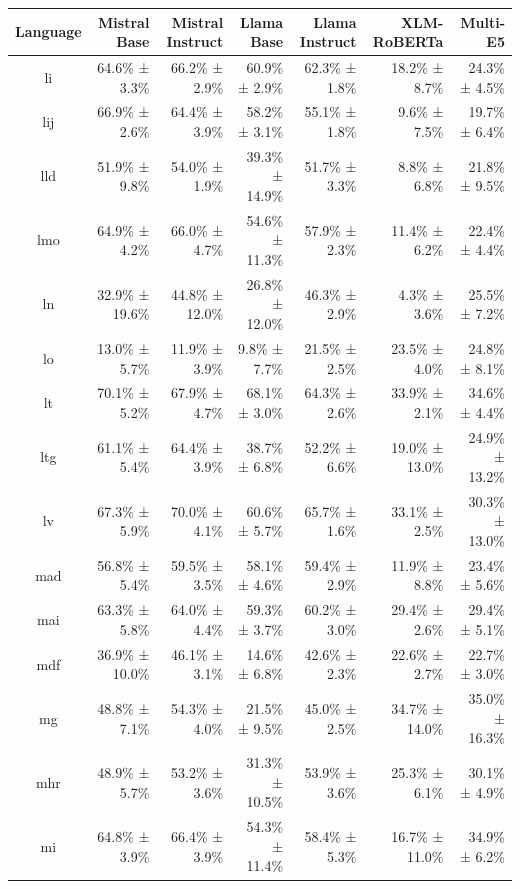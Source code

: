\documentclass[10pt, a4paper]{article}
\begin{document}
\begin{table}[h]
\centering
\scriptsize
\begin{tabular}{crrrrrr}
\hline
\textbf{Language} & \textbf{Mistral Base} & \textbf{Mistral Instruct} & \textbf{Llama Base} & \textbf{Llama Instruct} & \textbf{XLM-RoBERTa} & \textbf{Multi-E5} \\
\hline
li & 64.6\% ± 3.3\% & 66.2\% ± 2.9\% & 60.9\% ± 2.9\% & 62.3\% ± 1.8\% & 18.2\% ± 8.7\% & 24.3\% ± 4.5\% \\
lij & 66.9\% ± 2.6\% & 64.4\% ± 3.9\% & 58.2\% ± 3.1\% & 55.1\% ± 1.8\% & 9.6\% ± 7.5\% & 19.7\% ± 6.4\% \\
lld & 51.9\% ± 9.8\% & 54.0\% ± 1.9\% & 39.3\% ± 14.9\% & 51.7\% ± 3.3\% & 8.8\% ± 6.8\% & 21.8\% ± 9.5\% \\
lmo & 64.9\% ± 4.2\% & 66.0\% ± 4.7\% & 54.6\% ± 11.3\% & 57.9\% ± 2.3\% & 11.4\% ± 6.2\% & 22.4\% ± 4.4\% \\
ln & 32.9\% ± 19.6\% & 44.8\% ± 12.0\% & 26.8\% ± 12.0\% & 46.3\% ± 2.9\% & 4.3\% ± 3.6\% & 25.5\% ± 7.2\% \\
lo & 13.0\% ± 5.7\% & 11.9\% ± 3.9\% & 9.8\% ± 7.7\% & 21.5\% ± 2.5\% & 23.5\% ± 4.0\% & 24.8\% ± 8.1\% \\
lt & 70.1\% ± 5.2\% & 67.9\% ± 4.7\% & 68.1\% ± 3.0\% & 64.3\% ± 2.6\% & 33.9\% ± 2.1\% & 34.6\% ± 4.4\% \\
ltg & 61.1\% ± 5.4\% & 64.4\% ± 3.9\% & 38.7\% ± 6.8\% & 52.2\% ± 6.6\% & 19.0\% ± 13.0\% & 24.9\% ± 13.2\% \\
lv & 67.3\% ± 5.9\% & 70.0\% ± 4.1\% & 60.6\% ± 5.7\% & 65.7\% ± 1.6\% & 33.1\% ± 2.5\% & 30.3\% ± 13.0\% \\
mad & 56.8\% ± 5.4\% & 59.5\% ± 3.5\% & 58.1\% ± 4.6\% & 59.4\% ± 2.9\% & 11.9\% ± 8.8\% & 23.4\% ± 5.6\% \\
mai & 63.3\% ± 5.8\% & 64.0\% ± 4.4\% & 59.3\% ± 3.7\% & 60.2\% ± 3.0\% & 29.4\% ± 2.6\% & 29.4\% ± 5.1\% \\
mdf & 36.9\% ± 10.0\% & 46.1\% ± 3.1\% & 14.6\% ± 6.8\% & 42.6\% ± 2.3\% & 22.6\% ± 2.7\% & 22.7\% ± 3.0\% \\
mg & 48.8\% ± 7.1\% & 54.3\% ± 4.0\% & 21.5\% ± 9.5\% & 45.0\% ± 2.5\% & 34.7\% ± 14.0\% & 35.0\% ± 16.3\% \\
mhr & 48.9\% ± 5.7\% & 53.2\% ± 3.6\% & 31.3\% ± 10.5\% & 53.9\% ± 3.6\% & 25.3\% ± 6.1\% & 30.1\% ± 4.9\% \\
mi & 64.8\% ± 3.9\% & 66.4\% ± 3.9\% & 54.3\% ± 11.4\% & 58.4\% ± 5.3\% & 16.7\% ± 11.0\% & 34.9\% ± 6.2\% \\

\end{tabular}
\end{table}
\end{document}
